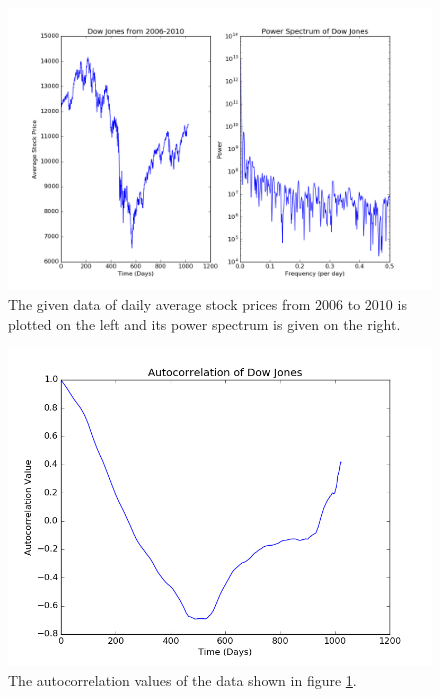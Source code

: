 \message{ !name(Assn2.tex)}\documentclass[twocolumn]{article}
\begin{document}
\begin{figure}
  \includegraphics[width=\linewidth]{dow.png}
  \caption{
    The given data of daily average stock prices from $2006$ to $2010$ is plotted on the left and its power spectrum is given on the right.
  }
  \label{fig:dow}
\end{figure}

\begin{figure}
  \includegraphics[width=\linewidth]{dow_ac.png}
  \caption{
    The autocorrelation values of the data shown in figure \ref{fig:dow}.
  }
  \label{fig:dow_ac}
\end{figure}
\end{document}
